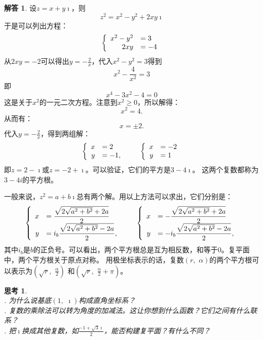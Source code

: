 \documentclass[12pt,UTF8]{ctexbook}
\theoremstyle{definition}
\newtheorem*{so}{解答}
\theoremstyle{plain}
\newtheorem{sk}{思考}[section]
\begin{document}
\begin{so}
    设$z = x + y\imath$，则
    $$ z^2 = x^2 - y^2 + 2xy\imath$$
    于是可以列出方程：
    $$
    \left\{
        \begin{array}[]{rl}
            x^2 - y^2 &= 3 \\
            2xy &= -4
        \end{array}
    \right.
    $$
    从$2xy = -2$可以得出$y = -\frac{2}{x}$，代入$x^2 - y^2 = 3$得到
    $$ x^2 - \frac{4}{x^2} = 3$$
    即
    $$ x^4 - 3x^2 - 4 = 0$$
    这是关于$x^2$的一元二次方程。注意到$x^2 \geqslant 0$，所以解得：
    $$ x^2 = 4. $$
    从而有：
    $$ x = \pm 2 . $$
    代入$y = -\frac{2}{x}$，得到两组解：
    $$
    \left\{
        \begin{array}[]{rl}
            x &= 2 \\
            y &= -1,
        \end{array}
    \right.
    \qquad
    \left\{
        \begin{array}[]{rl}
            x &= -2 \\
            y &= 1
        \end{array}
    \right.
    $$ 
    即$z = 2 - \imath$或$z = -2 + \imath$。可以验证，它们的平方是$3 - 4\imath$。
    这两个复数都称为$3 - 4i$的平方根。
\end{so}

一般来说，$z^2 = a + b\imath$总有两个解。用以上方法可以求出，它们分别是：
$$
\left\{
    \begin{array}[]{rl}
        x &=\displaystyle \frac{\sqrt{2\sqrt{a^2 + b^2} + 2a}}{2} \\
        y &=\displaystyle i_b \frac{\sqrt{2\sqrt{a^2 + b^2} - 2a}}{2},
    \end{array}
\right.
\qquad
\left\{
    \begin{array}[]{rl}
        x &=\displaystyle -\frac{\sqrt{2\sqrt{a^2 + b^2} + 2a}}{2} \\
        y &=\displaystyle -i_b \frac{\sqrt{2\sqrt{a^2 + b^2} - 2a}}{2},
    \end{array}
\right.
$$ 
其中$i_b$是$b$的正负号。可以看出，两个平方根总是互为相反数，和等于$0$。复平面中，两个平方根关于原点对称。
用极坐标表示的话，复数$(r,\,\,\alpha)$的两个平方根可以表示为$\displaystyle\left(\sqrt{r},\,\,\frac{\alpha}{2}\right)$
和$\displaystyle\left(\sqrt{r},\,\,\frac{\alpha}{2}+\pi\right)$。

\begin{sk}
    \mbox{} \\
    . 为什么说基底$(1,\,\,\imath)$构成直角坐标系？\\
    . 复数的乘除法可以转为角度的加减法。这让你想到什么函数？它们之间有什么联系？\\
    . 把$\imath$换成其他复数，如$\displaystyle \frac{-1+\sqrt{3}\imath}{2}$，能否构建复平面？有什么不同？
\end{sk}
\end{document}
